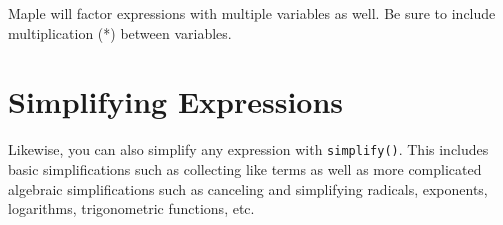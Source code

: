 \begin{maplegroup}
\begin{mapleinput}
\end{mapleinput}
\mapleresult
\begin{maplelatex}
\end{maplelatex}
\end{maplegroup}

Maple will factor expressions with multiple variables as well. Be sure to include multiplication (*) between variables.

\begin{maplegroup}
\begin{mapleinput}
\end{mapleinput}
\mapleresult
\begin{maplelatex}
\end{maplelatex}
\end{maplegroup}

\section{Simplifying Expressions}
\label{sec:simplifying_expressions}

Likewise, you can also simplify any expression with \texttt{simplify()}. This includes basic simplifications such as collecting like terms as well as more complicated algebraic simplifications such as canceling and simplifying radicals, exponents, logarithms, trigonometric functions, etc.


\begin{maplegroup}
\begin{mapleinput}
\end{mapleinput}
\mapleresult
\begin{maplelatex}
\end{maplelatex}
\end{maplegroup}

